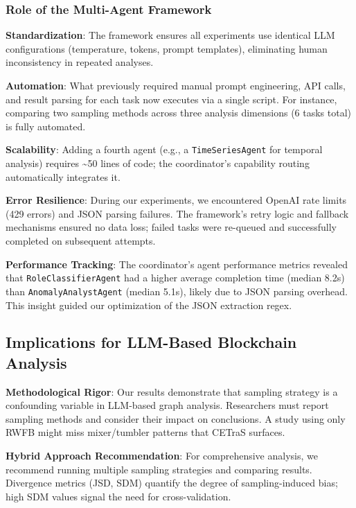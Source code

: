 \subsubsection{Role of the Multi-Agent Framework}

\textbf{Standardization}: The framework ensures all experiments use identical LLM configurations (temperature, tokens, prompt templates), eliminating human inconsistency in repeated analyses.

\textbf{Automation}: What previously required manual prompt engineering, API calls, and result parsing for each task now executes via a single script. For instance, comparing two sampling methods across three analysis dimensions (6 tasks total) is fully automated.

\textbf{Scalability}: Adding a fourth agent (e.g., a \texttt{TimeSeriesAgent} for temporal analysis) requires \textasciitilde50 lines of code; the coordinator's capability routing automatically integrates it.

\textbf{Error Resilience}: During our experiments, we encountered OpenAI rate limits (429 errors) and JSON parsing failures. The framework's retry logic and fallback mechanisms ensured no data loss; failed tasks were re-queued and successfully completed on subsequent attempts.

\textbf{Performance Tracking}: The coordinator's agent performance metrics revealed that \texttt{RoleClassifierAgent} had a higher average completion time (median 8.2s) than \texttt{AnomalyAnalystAgent} (median 5.1s), likely due to JSON parsing overhead. This insight guided our optimization of the JSON extraction regex.

\subsection{Implications for LLM-Based Blockchain Analysis}

\textbf{Methodological Rigor}: Our results demonstrate that sampling strategy is a confounding variable in LLM-based graph analysis. Researchers must report sampling methods and consider their impact on conclusions. A study using only RWFB might miss mixer/tumbler patterns that CETraS surfaces.

\textbf{Hybrid Approach Recommendation}: For comprehensive analysis, we recommend running multiple sampling strategies and comparing results. Divergence metrics (JSD, SDM) quantify the degree of sampling-induced bias; high SDM values signal the need for cross-validation.

